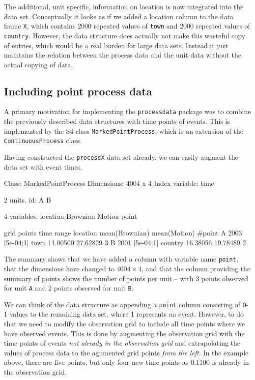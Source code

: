 \documentclass[11pt,a4paper,twoside]{article}
\begin{document}
The additional, unit specific, information on location is now
integrated into the data set. Conceptually it looks as if we added a location
column to the data frame \verb+X+, which contains 2000 repeated values
of \verb+town+ and 2000 repeated values of \verb+country+. However, 
the data structure does actually not make this wasteful copy of  
entries, which would be a real burden for large data sets. Instead it
just maintains the relation between the process data and the unit data
without the actual copying of data. 

\subsection{Including point process data}

A primary motivation for implementing the \verb+processdata+ package
was to combine the previously described data structures with time
points of events. This is implemented by the S4 class
\verb+MarkedPointProcess+, which is an extension of the
\verb+ContinuousProcess+ class.  

Having constructed the \verb+processX+ data set already, we can easily
augment the data set with event times.

\begin{Schunk}
\begin{Soutput}
Class: MarkedPointProcess 
Dimensions: 4004 x 4 
Index variable: time 

2 units.
   id: A B

4 variables.
   location Brownian Motion point

  grid points time range location mean(Brownian) mean(Motion) #point
A        2003  [5e-04;1]     town       11.00500     27.62829      3
B        2001  [5e-04;1]  country       16.38056     19.78489      2
\end{Soutput}
\end{Schunk}

The summary shows that we have added a column with variable name \verb+point+,
that the dimensions have changed to $4004 \times 4$, and that the column
providing the summary of points shows the number of points per unit --
with 3 points observed for unit
\verb+A+ and 2 points observed for unit \verb+B+. 

We can think of the data structure as appending a \verb+point+
column consisting of 0-1 values to the remaining data set, where 1
represents an event. However, to do that we need to modify 
the observation grid to include all time points where we
have observed events. This is done by augmenting the observation grid
with the time points of events \emph{not already in the observation
  grid} and extrapolating the
values of process data to the agumented grid points \emph{from the
  left}. In the example above, there are five points, but only four 
new time points as $0.1100$ is already in the observation grid. 
\end{document}

